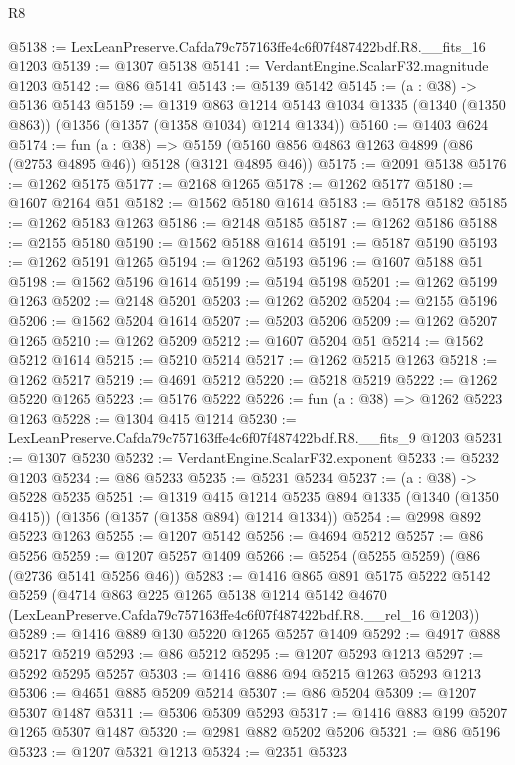 \begin{lexlean}{R8}
\begin{coremodule}
@5138 := LexLeanPreserve.Cafda79c757163ffe4c6f07f487422bdf.R8.__fits_16 @1203
@5139 := @1307 @5138
@5141 := VerdantEngine.ScalarF32.magnitude @1203
@5142 := @86 @5141
@5143 := @5139 @5142
@5145 := (a : @38) -> @5136 @5143
@5159 := @1319
    @863
    @1214
    @5143
    @1034
    @1335
    (@1340 (@1350 @863))
    (@1356 (@1357 (@1358 @1034) @1214 @1334))
@5160 := @1403 @624
@5174 := fun (a : @38) =>
  @5159 (@5160 @856 @4863 @1263 @4899 (@86 (@2753 @4895 @46)) @5128 (@3121 @4895 @46))
@5175 := @2091 @5138
@5176 := @1262 @5175
@5177 := @2168 @1265
@5178 := @1262 @5177
@5180 := @1607 @2164 @51
@5182 := @1562 @5180 @1614
@5183 := @5178 @5182
@5185 := @1262 @5183 @1263
@5186 := @2148 @5185
@5187 := @1262 @5186
@5188 := @2155 @5180
@5190 := @1562 @5188 @1614
@5191 := @5187 @5190
@5193 := @1262 @5191 @1265
@5194 := @1262 @5193
@5196 := @1607 @5188 @51
@5198 := @1562 @5196 @1614
@5199 := @5194 @5198
@5201 := @1262 @5199 @1263
@5202 := @2148 @5201
@5203 := @1262 @5202
@5204 := @2155 @5196
@5206 := @1562 @5204 @1614
@5207 := @5203 @5206
@5209 := @1262 @5207 @1265
@5210 := @1262 @5209
@5212 := @1607 @5204 @51
@5214 := @1562 @5212 @1614
@5215 := @5210 @5214
@5217 := @1262 @5215 @1263
@5218 := @1262 @5217
@5219 := @4691 @5212
@5220 := @5218 @5219
@5222 := @1262 @5220 @1265
@5223 := @5176 @5222
@5226 := fun (a : @38) => @1262 @5223 @1263
@5228 := @1304 @415 @1214
@5230 := LexLeanPreserve.Cafda79c757163ffe4c6f07f487422bdf.R8.__fits_9 @1203
@5231 := @1307 @5230
@5232 := VerdantEngine.ScalarF32.exponent
@5233 := @5232 @1203
@5234 := @86 @5233
@5235 := @5231 @5234
@5237 := (a : @38) -> @5228 @5235
@5251 := @1319
    @415
    @1214
    @5235
    @894
    @1335
    (@1340 (@1350 @415))
    (@1356 (@1357 (@1358 @894) @1214 @1334))
@5254 := @2998 @892 @5223 @1263
@5255 := @1207 @5142
@5256 := @4694 @5212
@5257 := @86 @5256
@5259 := @1207 @5257 @1409
@5266 := @5254 (@5255 @5259) (@86 (@2736 @5141 @5256 @46))
@5283 := @1416
    @865
    @891
    @5175
    @5222
    @5142
    @5259
    (@4714
      @863
      @225
      @1265
      @5138
      @1214
      @5142
      @4670
      (LexLeanPreserve.Cafda79c757163ffe4c6f07f487422bdf.R8.__rel_16 @1203))
@5289 := @1416 @889 @130 @5220 @1265 @5257 @1409
@5292 := @4917 @888 @5217 @5219
@5293 := @86 @5212
@5295 := @1207 @5293 @1213
@5297 := @5292 @5295 @5257
@5303 := @1416 @886 @94 @5215 @1263 @5293 @1213
@5306 := @4651 @885 @5209 @5214
@5307 := @86 @5204
@5309 := @1207 @5307 @1487
@5311 := @5306 @5309 @5293
@5317 := @1416 @883 @199 @5207 @1265 @5307 @1487
@5320 := @2981 @882 @5202 @5206
@5321 := @86 @5196
@5323 := @1207 @5321 @1213
@5324 := @2351 @5323

\end{coremodule}
\end{lexlean}
